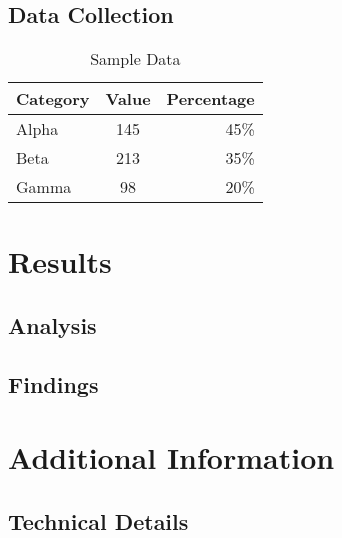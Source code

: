 \documentclass{scrreprt}
\begin{document}
\section{Data Collection}
\begin{table}[h]
  \centering
  \caption{Sample Data}
  \begin{tabular}{lcr}
    \toprule
    Category & Value & Percentage \\
    \midrule
    Alpha    & 145   & 45\%       \\
    Beta     & 213   & 35\%       \\
    Gamma    & 98    & 20\%       \\
    \bottomrule
  \end{tabular}
\end{table}

\chapter{Results}
\section{Analysis}
\blindtext

\section{Findings}
\blindtext[2]

\blindtext

\appendix
\chapter{Additional Information}
\section{Technical Details}
\blindtext
\end{document}
